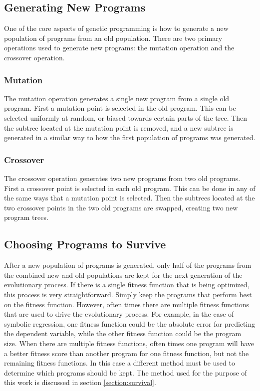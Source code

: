 \subsection{Generating New Programs}
\label{section:gp_operators}
One of the core aspects of genetic programming is how to generate a new population of programs from an old population.  There are two primary operations used to generate new programs: the mutation operation and the crossover operation.

\subsubsection{Mutation}
The mutation operation generates a single new program from a single old program.  First a mutation point is selected in the old program.  This can be selected uniformly at random, or biased towards certain parts of the tree.  Then the subtree located at the mutation point is removed, and a new subtree is generated in a similar way to how the first population of programs was generated.

\subsubsection{Crossover}
The crossover operation generates two new programs from two old programs.  First a crossover point is selected in each old program.  This can be done in any of the same ways that a mutation point is selected.  Then the subtrees located at the two crossover points in the two old programs are swapped, creating two new program trees.

\subsection{Choosing Programs to Survive}
After a new population of programs is generated, only half of the programs from the combined new and old populations are kept for the next generation of the evolutionary process.  If there is a single fitness function that is being optimized, this process is very straightforward.  Simply keep the programs that perform best on the fitness function.  However, often times there are multiple fitness functions that are used to drive the evolutionary process.  For example, in the case of symbolic regression, one fitness function could be the absolute error for predicting the dependent variable, while the other fitness function could be the program size.  When there are multiple fitness functions, often times one program will have a better fitness score than another program for one fitness function, but not the remaining fitness functions.  In this case a different method must be used to determine which programs should be kept.  The method used for the purpose of this work is discussed in section \ref{section:survival}.

